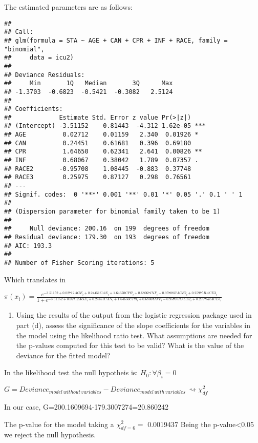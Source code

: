 \documentclass[]{article}
\begin{document}
The estimated parameters are as follows:

\begin{verbatim}
## 
## Call:
## glm(formula = STA ~ AGE + CAN + CPR + INF + RACE, family = "binomial", 
##     data = icu2)
## 
## Deviance Residuals: 
##     Min       1Q   Median       3Q      Max  
## -1.3703  -0.6823  -0.5421  -0.3082   2.5124  
## 
## Coefficients:
##             Estimate Std. Error z value Pr(>|z|)    
## (Intercept) -3.51152    0.81443  -4.312 1.62e-05 ***
## AGE          0.02712    0.01159   2.340  0.01926 *  
## CAN          0.24451    0.61681   0.396  0.69180    
## CPR          1.64650    0.62341   2.641  0.00826 ** 
## INF          0.68067    0.38042   1.789  0.07357 .  
## RACE2       -0.95708    1.08445  -0.883  0.37748    
## RACE3        0.25975    0.87127   0.298  0.76561    
## ---
## Signif. codes:  0 '***' 0.001 '**' 0.01 '*' 0.05 '.' 0.1 ' ' 1
## 
## (Dispersion parameter for binomial family taken to be 1)
## 
##     Null deviance: 200.16  on 199  degrees of freedom
## Residual deviance: 179.30  on 193  degrees of freedom
## AIC: 193.3
## 
## Number of Fisher Scoring iterations: 5
\end{verbatim}

Which translates in

$\pi(x_i)=\frac{e^{-3.51152+0.02712AGE_i+0.24451CAN_i+1.64650CPR_i+0.68067INF_i-0.95708RACE2_i+0.25975RACE3_i}}{1+e^{-3.51152+0.02712AGE_i+0.24451CAN_i+1.64650CPR_i+0.68067INF_i-0.95708RACE2_i+0.25975RACE3_i}}$

\begin{enumerate}
\def\labelenumi{\alph{enumi}.}
\setcounter{enumi}{4}
\itemsep1pt\parskip0pt
\item
  Using the results of the output from the logistic regression package
  used in part (d), assess the significance of the slope coefficients
  for the variables in the model using the likelihood ratio test. What
  assumptions are needed for the p-values computed for this test to be
  valid? What is the value of the deviance for the fitted model?
\end{enumerate}

In the likelihood test the null hypotheis is: $H_0: \forall\beta_i=0$

$G=Deviance_{model\,without\,variables}-Deviance_{model\,with\,variables}\,\rightsquigarrow\chi^2_{df}$

In our case, G=200.1609694-179.3007274=20.860242

The p-value for the model taking a $\chi^{2}_{df=6}=$ 0.0019437 Being
the p-value\textless{}0.05 we reject the null hypothesis.
\end{document}
